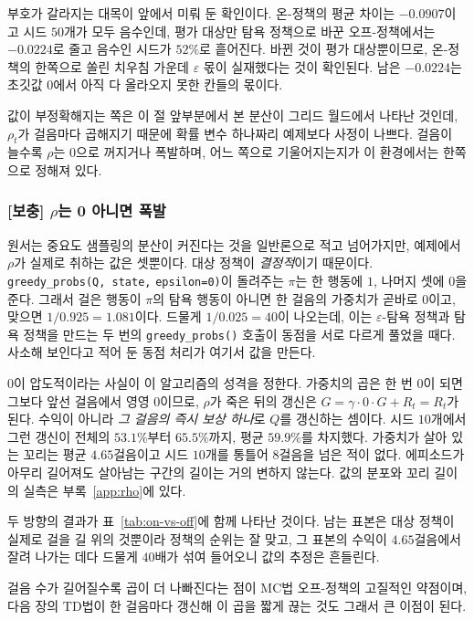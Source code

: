 \documentclass[11pt,a4paper]{article}
\begin{document}
부호가 갈라지는 대목이 앞에서 미뤄 둔 확인이다. 온-정책의 평균 차이는
$-0.0907$이고 시드 $50$개가 모두 음수인데, 평가 대상만 탐욕 정책으로 바꾼 오프-정책에서는
$-0.0224$로 줄고 음수인 시드가 $52\%$로 흩어진다. 바뀐 것이 평가 대상뿐이므로, 온-정책의
한쪽으로 쏠린 치우침 가운데 $\varepsilon$ 몫이 실재했다는 것이 확인된다. 남은 $-0.0224$는 초깃값
$0$에서 아직 다 올라오지 못한 칸들의 몫이다.

값이 부정확해지는 쪽은 이 절 앞부분에서 본 분산이 그리드 월드에서 나타난 것인데,
$\rho_t$가 걸음마다 곱해지기 때문에 확률 변수 하나짜리 예제보다 사정이 나쁘다. 걸음이 늘수록
$\rho$는 $0$으로 꺼지거나 폭발하며, 어느 쪽으로 기울어지는지가 이 환경에서는 한쪽으로 정해져
있다.

\subsubsection{[보충] \texorpdfstring{$\rho$}{rho}는 0 아니면 폭발}
\label{sec:rho}

원서는 중요도 샘플링의 분산이 커진다는 것을 일반론으로 적고 넘어가지만, 예제에서 $\rho$가 실제로
취하는 값은 셋뿐이다. 대상 정책이 \emph{결정적}이기 때문이다. \lstinline|greedy_probs(Q, state,|
\lstinline|epsilon=0)|이 돌려주는 $\pi$는 한 행동에 $1$, 나머지 셋에 $0$을 준다. 그래서 걸은 행동이
$\pi$의 탐욕 행동이 아니면 한 걸음의 가중치가 곧바로 $0$이고, 맞으면 $1/0.925 = 1.081$이다. 드물게
$1/0.025 = 40$이 나오는데, 이는 $\varepsilon$-탐욕 정책과 탐욕 정책을 만드는 두 번의
\lstinline|greedy_probs()| 호출이 동점을 서로 다르게 풀었을 때다. 사소해 보인다고 적어 둔 동점
처리가 여기서 값을 만든다.

$0$이 압도적이라는 사실이 이 알고리즘의 성격을 정한다. 가중치의 곱은 한 번 $0$이 되면 그보다 앞선
걸음에서 영영 $0$이므로, $\rho$가 죽은 뒤의 갱신은 $G = \gamma \cdot 0 \cdot G + R_t = R_t$가 된다.
수익이 아니라 \emph{그 걸음의 즉시 보상 하나}로 $Q$를 갱신하는 셈이다. 시드 $10$개에서 그런 갱신이
전체의 $53.1\%$부터 $65.5\%$까지, 평균 $59.9\%$를 차지했다. 가중치가 살아 있는 꼬리는 평균
$4.65$걸음이고 시드 $10$개를 통틀어 $8$걸음을 넘은 적이 없다. 에피소드가 아무리 길어져도 살아남는
구간의 길이는 거의 변하지 않는다. 값의 분포와 꼬리 길이의 실측은 부록~\ref{app:rho}에 있다.

두 방향의 결과가 표~\ref{tab:on-vs-off}에 함께 나타난 것이다. 남는 표본은 대상 정책이 실제로 걸을
길 위의 것뿐이라 정책의 순위는 잘 맞고, 그 표본의 수익이 $4.65$걸음에서 잘려 나가는 데다 드물게
$40$배가 섞여 들어오니 값의 추정은 흔들린다.

걸음 수가 길어질수록 곱이 더 나빠진다는 점이 MC법 오프-정책의 고질적인 약점이며, 다음 장의 TD법이
한 걸음마다 갱신해 이 곱을 짧게 끊는 것도 그래서 큰 이점이 된다.
\end{document}
